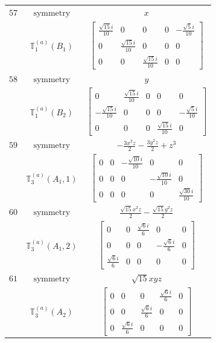 \documentclass[fleqn,8pt,landscape]{jsarticle}
\begin{document}
\begin{longtable}{ccc}
$ 57 $ & $ \text{symmetry} $ & $ x $ \\
$  $ & $ \mathbb{T}_{1}^{(a)}(B_{1}) $ & $ \begin{bmatrix} \frac{\sqrt{15} i}{10} & 0 & 0 & 0 & - \frac{\sqrt{5} i}{10} \\ 0 & \frac{\sqrt{15} i}{10} & 0 & 0 & 0 \\ 0 & 0 & \frac{\sqrt{15} i}{10} & 0 & 0 \end{bmatrix} $ \\ \hline
$ 58 $ & $ \text{symmetry} $ & $ y $ \\
$  $ & $ \mathbb{T}_{1}^{(a)}(B_{2}) $ & $ \begin{bmatrix} 0 & \frac{\sqrt{15} i}{10} & 0 & 0 & 0 \\ - \frac{\sqrt{15} i}{10} & 0 & 0 & 0 & - \frac{\sqrt{5} i}{10} \\ 0 & 0 & 0 & \frac{\sqrt{15} i}{10} & 0 \end{bmatrix} $ \\ \hline
$ 59 $ & $ \text{symmetry} $ & $ - \frac{3 x^{2} z}{2} - \frac{3 y^{2} z}{2} + z^{3} $ \\
$  $ & $ \mathbb{T}_{3}^{(a)}(A_{1},1) $ & $ \begin{bmatrix} 0 & 0 & - \frac{\sqrt{10} i}{10} & 0 & 0 \\ 0 & 0 & 0 & - \frac{\sqrt{10} i}{10} & 0 \\ 0 & 0 & 0 & 0 & \frac{\sqrt{30} i}{10} \end{bmatrix} $ \\ \hline
$ 60 $ & $ \text{symmetry} $ & $ \frac{\sqrt{15} x^{2} z}{2} - \frac{\sqrt{15} y^{2} z}{2} $ \\
$  $ & $ \mathbb{T}_{3}^{(a)}(A_{1},2) $ & $ \begin{bmatrix} 0 & 0 & \frac{\sqrt{6} i}{6} & 0 & 0 \\ 0 & 0 & 0 & - \frac{\sqrt{6} i}{6} & 0 \\ \frac{\sqrt{6} i}{6} & 0 & 0 & 0 & 0 \end{bmatrix} $ \\ \hline
$ 61 $ & $ \text{symmetry} $ & $ \sqrt{15} x y z $ \\
$  $ & $ \mathbb{T}_{3}^{(a)}(A_{2}) $ & $ \begin{bmatrix} 0 & 0 & 0 & \frac{\sqrt{6} i}{6} & 0 \\ 0 & 0 & \frac{\sqrt{6} i}{6} & 0 & 0 \\ 0 & \frac{\sqrt{6} i}{6} & 0 & 0 & 0 \end{bmatrix} $ \\ \hline

\end{longtable}
\end{document}
